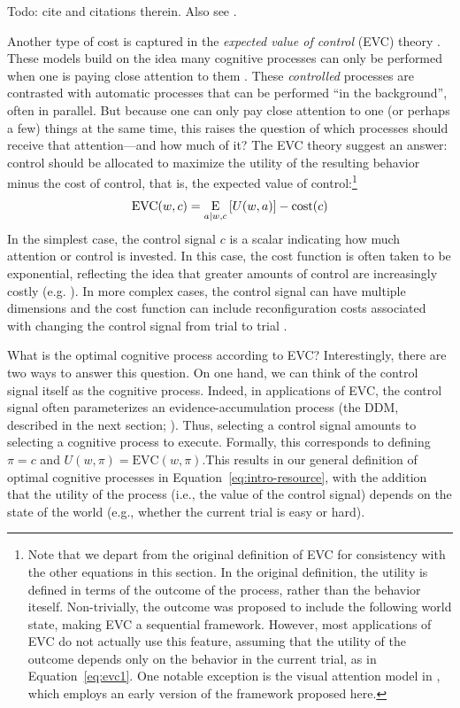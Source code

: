 Todo: cite \citep{kool2017costbenefit} and citations therein. Also see \citep{kool2018mental}.


Another type of cost is captured in the \emph{expected value of control} (EVC) theory \citep{shenhav2013expected}. These models build on the idea many cognitive processes can only be performed when one is paying close attention to them \citep{cohen1990control}. These \emph{controlled} processes are contrasted with automatic processes that can be performed ``in the background'', often in parallel. But because one can only pay close attention to one (or perhaps a few) things at the same time, this raises the question of which processes should receive that attention---and how much of it? The EVC theory suggest an answer: control should be allocated to maximize the utility of the resulting behavior minus the cost of control, that is, the expected value of control:\footnote{%
  Note that we depart from the original definition of EVC \citep{shenhav2013expected} for consistency with the other equations in this section. In the original definition, the utility is defined in terms of the outcome of the process, rather than the behavior iteself. Non-trivially, the outcome was proposed to include the following world state, making EVC a sequential framework. However, most applications of EVC do not actually use this feature, assuming that the utility of the outcome depends only on the behavior in the current trial, as in Equation~\ref{eq:evc1}. One notable exception is the visual attention model in \citet{lieder2018rational}, which employs an early version of the framework proposed here.
} 
\begin{equation}\label{eq:evc1}
  \text{EVC}(w, c) = 
    \operatorname*{E}_{a \mid w, c} \left[
      U(w, a)
    \right] - \text{cost}(c)
\end{equation}
In the simplest case, the control signal $c$ is a scalar indicating how much attention or control is invested. In this case, the cost function is often taken to be exponential, reflecting the idea that greater amounts of control are increasingly costly (e.g. \citealp{musslick2018estimating}). In more complex cases, the control signal can have multiple dimensions \citep{ritz2021cognitive} and the cost function can include reconfiguration costs associated with changing the control signal from trial to trial \citep{musslick2015computational,grahek2020computational}.

What is the optimal cognitive process according to EVC? Interestingly, there are two ways to answer this question. On one hand, we can think of the control signal itself as the cognitive process. Indeed, in applications of EVC, the control signal often parameterizes an evidence-accumulation process (the DDM, described in the next section; \citealp{musslick2015computational,grahek2020computational}). Thus, selecting a control signal amounts to selecting a cognitive process to execute. Formally, this corresponds to defining $π = c$ and $U(w, π) = \text{EVC}(w, π)$.This results in our general definition of optimal cognitive processes in Equation~\ref{eq:intro-resource}, with the addition that the utility of the process (i.e., the value of the control signal) depends on the state of the world (e.g., whether the current trial is easy or hard).

